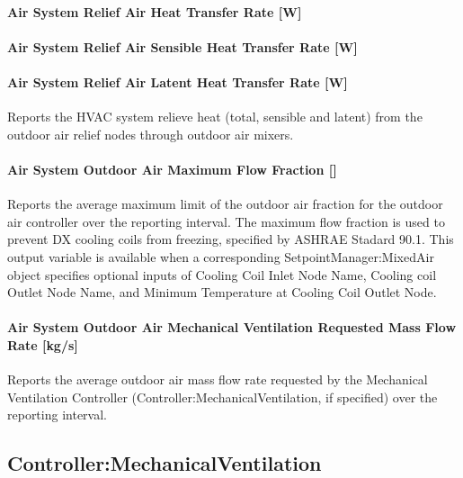 \paragraph{Air System Relief Air Heat Transfer Rate {[}W{]}}\label{air-system-relief-air-heat-transfer-rate-w}

\paragraph{Air System Relief Air Sensible Heat Transfer Rate {[}W{]}}\label{air-system-relief-air-sensible-heat-transfer-rate-w}

\paragraph{Air System Relief Air Latent Heat Transfer Rate {[}W{]}}\label{air-system-relief-air-latent-heat-transfer-rate-w}

Reports the HVAC system relieve heat (total, sensible and latent) from the outdoor air relief nodes through outdoor air mixers.

\paragraph{Air System Outdoor Air Maximum Flow Fraction {[]}}\label{air-system-outdoor-air-maximum-flow-fraction}

Reports the average maximum limit of the outdoor air fraction for the outdoor air controller over the reporting interval. The maximum flow fraction is used to prevent DX cooling coils from freezing, specified by ASHRAE Stadard 90.1. This output variable is available when a corresponding SetpointManager:MixedAir object specifies optional inputs of Cooling Coil Inlet Node Name, Cooling coil Outlet Node Name, and Minimum Temperature at Cooling Coil Outlet Node.

\paragraph{Air System Outdoor Air Mechanical Ventilation Requested Mass Flow Rate {[}kg/s{]}}\label{air-system-mechvent-air-mass-flow-rate-kgs}

Reports the average outdoor air mass flow rate requested by the Mechanical Ventilation Controller (Controller:MechanicalVentilation, if specified) over the reporting interval.

\subsection{Controller:MechanicalVentilation}\label{controllermechanicalventilation}

